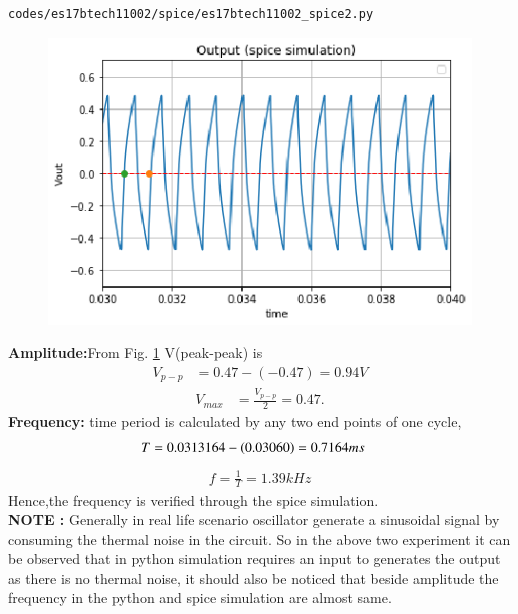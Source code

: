 \begin{enumerate}[label=\arabic*.,ref=\theenumi]
\begin{lstlisting}
codes/es17btech11002/spice/es17btech11002_spice2.py
\end{lstlisting}
\begin{figure}[!ht]
\centering
\includegraphics[width=\columnwidth]{./figs/es17btech11002/es17btech11002_spice2.eps}
\caption{}
\label{fig:es17btech11002_spice4}
\end{figure}
\renewcommand{\thefigure}{\theenumi}
\textbf{Amplitude:}From Fig. \ref{fig:es17btech11002_spice4} V(peak-peak) is 
\begin{align}
V_{p-p} &= 0.47-(-0.47) = 0.94V
\end{align}
\begin{align}
V_{max} &= \frac{V_{p-p}}{2} = 0.47.
\end{align}
\textbf{Frequency:} time period is calculated by any two end points of one cycle,
\begin{align}
T&=0.0313164 - \left(0.03060\right) = 0.7164 ms
\end{align}
\begin{align}
f = \frac{1}{T} = 1.39 kHz
\end{align}
Hence,the frequency is verified through the spice simulation.
\\
\textbf{NOTE :} Generally in real life scenario oscillator generate a sinusoidal signal by consuming the thermal noise in the circuit. So in the above two experiment it can be observed that in python simulation requires an input to generates the output as there is no thermal noise, it should also be noticed that beside amplitude the frequency in the python and spice simulation are almost same.  
\end{enumerate}
